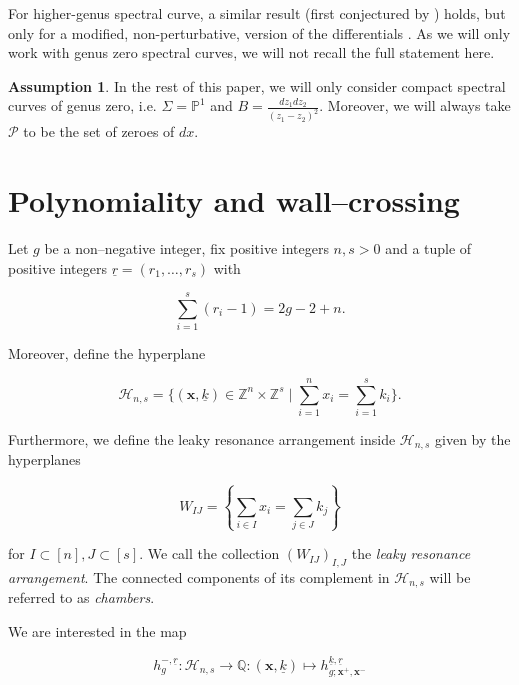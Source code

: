\documentclass[10pt,a4paper,oneside,no-math,reqno]{amsart}%
\theoremstyle{plain}
\theoremstyle{definition}
\newtheorem{assumption}[theorem]{Assumption}
\theoremstyle{remark}
\numberwithin{equation}{section}
\newcommand{\mb}[1]{\mathbb{#1}}
\newcommand{\mc}[1]{\mathcal{#1}}
\newcommand{\1}{\mathds{1}}
\renewcommand{\P}{\mb{P}}
\newcommand{\<}{\langle}
\renewcommand{\>}{\rangle}
\begin{document}
For higher-genus spectral curve, a similar result (first conjectured by \cite{BE12}) holds, but only for a modified, non-perturbative, version of the differentials \cite{ABDKS24KP+}. As we will only work with genus zero spectral curves, we will not recall the full statement here.

\begin{assumption}
    In the rest of this paper, we will only consider compact spectral curves of genus zero, i.e. $ \Sigma = \P^1$ and $ B = \frac{dz_1 dz_2}{(z_1 - z_2)^2}$. Moreover, we will always take $ \mc{P}$ to be the set of zeroes of $ dx$.
\end{assumption}

\section{Polynomiality and wall--crossing}
\label{PolyWC}

Let $g$ be a non--negative integer, fix positive integers $n,s>0$ and a tuple of positive integers $\underline{r}=(r_1,\dots,r_s)$ with

\begin{equation}
    \sum_{i=1}^s (r_i - 1)
    =
    2g-2+n.
\end{equation}

Moreover, define the hyperplane

\begin{equation}
    \mathcal{H}_{n,s}=\{(\mathbf{x},\underline{k})\in\mathbb{Z}^n\times\mathbb{Z}^s\mid \sum_{i=1}^nx_i=\sum_{i=1}^sk_i\}.
\end{equation}

Furthermore, we define the leaky resonance arrangement inside $\mathcal{H}_{n,s}$ given by the hyperplanes

\begin{equation}
    W_{IJ}=\left\{\sum_{i\in I}x_i=\sum_{j\in J}k_j\right\}
\end{equation}

for $I\subset[n],J\subset[s]$. We call the collection $(W_{IJ})_{I,J}$ the \emph{leaky resonance arrangement}. The connected components of its complement in $\mathcal{H}_{n,s}$ will be referred to as \emph{chambers}.


We are interested in the map

\begin{equation}
    h_g^{-,\underline{r}}
    \colon
    \mathcal{H}_{n,s}\to\mathbb{Q}
    \colon
    (\mathbf{x},\underline{k})\mapsto h^{\underline{k},\underline{r}}_{g;\mathbf{x}^+,\mathbf{x}^-}
\end{equation}
\end{document}
